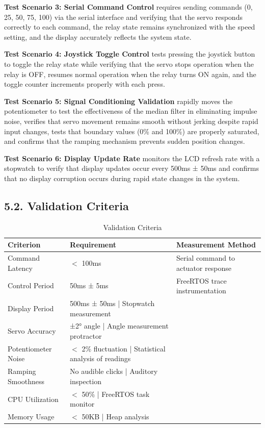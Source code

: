 \documentclass[12pt]{article}
\begin{document}
\textbf{Test Scenario 3: Serial Command Control} requires sending commands (0, 25, 50, 75, 100) via the serial interface and verifying that the servo responds correctly to each command, the relay state remains synchronized with the speed setting, and the display accurately reflects the system state.

\textbf{Test Scenario 4: Joystick Toggle Control} tests pressing the joystick button to toggle the relay state while verifying that the servo stops operation when the relay is OFF, resumes normal operation when the relay turns ON again, and the toggle counter increments properly with each press.

\textbf{Test Scenario 5: Signal Conditioning Validation} rapidly moves the potentiometer to test the effectiveness of the median filter in eliminating impulse noise, verifies that servo movement remains smooth without jerking despite rapid input changes, tests that boundary values (0\% and 100\%) are properly saturated, and confirms that the ramping mechanism prevents sudden position changes.

\textbf{Test Scenario 6: Display Update Rate} monitors the LCD refresh rate with a stopwatch to verify that display updates occur every 500ms ± 50ms and confirms that no display corruption occurs during rapid state changes in the system.

\subsection*{5.2. Validation Criteria}

\begin{table}[H]
	\centering
	\caption{Validation Criteria}
	\label{tab:validation-criteria}
	\begin{tabular}{|l|l|l|}
		\hline
		\textbf{Criterion} & \textbf{Requirement} & \textbf{Measurement Method} \\
		\hline
		Command Latency & $<$ 100ms & Serial command to actuator response \\
		\hline
		Control Period & 50ms ± 5ms & FreeRTOS trace instrumentation \\
		\hline
		Display Period & 500ms ± 50ms | Stopwatch measurement \\
		\hline
		Servo Accuracy & ±2° angle | Angle measurement protractor \\
		\hline
		Potentiometer Noise & $<$ 2\% fluctuation | Statistical analysis of readings \\
		\hline
		Ramping Smoothness & No audible clicks | Auditory inspection \\
		\hline
		CPU Utilization & $<$ 50\% | FreeRTOS task monitor \\
		\hline
		Memory Usage & $<$ 50KB | Heap analysis \\
		\hline
	\end{tabular}
\end{table}
\end{document}
